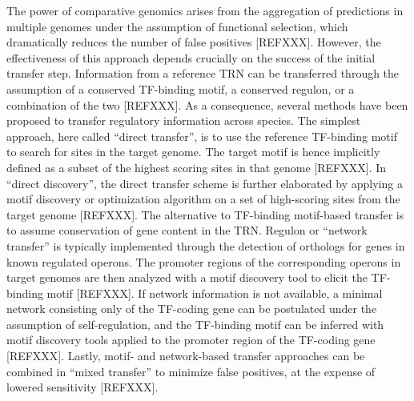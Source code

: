 The power of comparative genomics arises from the aggregation of predictions in
multiple genomes under the assumption of functional selection, which
dramatically reduces the number of false positives [REFXXX]. However, the
effectiveness of this approach depends crucially on the success of the initial
transfer step. Information from a reference TRN can be transferred through the
assumption of a conserved TF-binding motif, a conserved regulon, or a
combination of the two [REFXXX]. As a consequence, several methods have been
proposed to transfer regulatory information across species. The simplest
approach, here called “direct transfer”, is to use the reference TF-binding
motif to search for sites in the target genome. The target motif is hence
implicitly defined as a subset of the highest scoring sites in that genome
[REFXXX]. In “direct discovery”, the direct transfer scheme is further
elaborated by applying a motif discovery or optimization algorithm on a set of
high-scoring sites from the target genome [REFXXX]. The alternative to
TF-binding motif-based transfer is to assume conservation of gene content in
the TRN. Regulon or “network transfer” is typically implemented through the
detection of orthologs for genes in known regulated operons. The promoter
regions of the corresponding operons in target genomes are then analyzed with a
motif discovery tool to elicit the TF-binding motif [REFXXX]. If network
information is not available, a minimal network consisting only of the
TF-coding gene can be postulated under the assumption of self-regulation, and
the TF-binding motif can be inferred with motif discovery tools applied to the
promoter region of the TF-coding gene [REFXXX]. Lastly, motif- and
network-based transfer approaches can be combined in “mixed transfer” to
minimize false positives, at the expense of lowered sensitivity [REFXXX].

